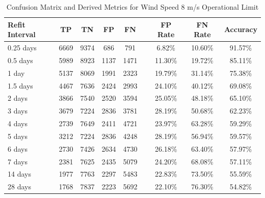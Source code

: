 \begin{table}[ht!]
    \centering
    \caption{Confusion Matrix and Derived Metrics for Wind Speed 8 m/s Operational Limit}
    \label{tab:wind_speed_8}
    \begin{tabular}{|l|c|c|c|c|c|c|c|c|}
        \hline
        \textbf{Refit Interval} & \textbf{TP} & \textbf{TN} & \textbf{FP} & \textbf{FN} && \textbf{FP Rate} & \textbf{FN Rate} & \textbf{Accuracy} \\
        \hline
        0.25 days & 6669 & 9374 & 686  & 791  && 6.82\%  & 10.60\% & 91.57\% \\
        0.5 days  & 5989 & 8923 & 1137 & 1471 && 11.30\% & 19.72\% & 85.11\% \\
        1 day     & 5137 & 8069 & 1991 & 2323 && 19.79\% & 31.14\% & 75.38\% \\
        1.5 days  & 4467 & 7636 & 2424 & 2993 && 24.10\% & 40.12\% & 69.08\% \\
        2 days    & 3866 & 7540 & 2520 & 3594 && 25.05\% & 48.18\% & 65.10\% \\
        3 days    & 3679 & 7224 & 2836 & 3781 && 28.19\% & 50.68\% & 62.23\% \\
        4 days    & 2739 & 7649 & 2411 & 4721 && 23.97\% & 63.28\% & 59.29\% \\
        5 days    & 3212 & 7224 & 2836 & 4248 && 28.19\% & 56.94\% & 59.57\% \\
        6 days    & 2730 & 7426 & 2634 & 4730 && 26.18\% & 63.40\% & 57.97\% \\
        7 days    & 2381 & 7625 & 2435 & 5079 && 24.20\% & 68.08\% & 57.11\% \\
        14 days   & 1977 & 7763 & 2297 & 5483 && 22.83\% & 73.50\% & 55.59\% \\
        28 days   & 1768 & 7837 & 2223 & 5692 && 22.10\% & 76.30\% & 54.82\% \\
        \hline
    \end{tabular}
\end{table}

